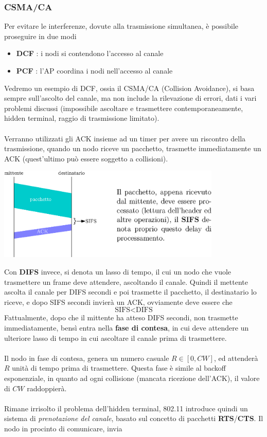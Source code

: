 \documentclass[12pt, letterpaper]{article}
\newcommand{\acc}{\\\hphantom{}\\}
\begin{document}
\subsubsection{CSMA/CA}
Per evitare le interferenze, dovute alla trasmissione simultanea, è possibile proseguire in due modi\begin{itemize}
    \item \textbf{DCF} : i nodi si contendono l'accesso al canale
    \item \textbf{PCF} : l'AP coordina i nodi nell'accesso al canale
\end{itemize} 
Vedremo un esempio di DCF, ossia il CSMA/CA (Collision Avoidance), si basa sempre sull'ascolto del canale, ma non 
include la rilevazione di errori, dati i vari problemi discussi (impossibile ascoltare e trasmettere contemporaneamente, 
hidden terminal, raggio di trasmissione limitato).\acc 
Verranno utilizzati gli ACK insieme ad un timer per avere un riscontro della trasmissione, quando un nodo riceve un 
pacchetto, trasmette immediatamente un ACK (quest'ultimo può essere soggetto a collisioni).\begin{center}
    \includegraphics[width=0.8\textwidth ]{images/CSMA-CA.eps}
\end{center}
Con \textbf{DIFS} invece, si denota un lasso di tempo, il cui un nodo che vuole trasmettere un frame deve 
attendere, ascoltando il canale. Quindi il mettente ascolta il canale per DIFS secondi e poi trasmette il pacchetto, il destinatario lo riceve, 
e dopo SIFS secondi invierà un ACK, ovviamente deve essere che $$\text{SIFS}<\text{DIFS}$$
Fattualmente, dopo che il mittente ha atteso DIFS secondi, non trasmette immediatamente, bensì entra nella 
\textbf{fase di contesa}, in cui deve attendere un ulteriore lasso di tempo in cui ascoltare il canale prima 
di trasmettere. \acc Il nodo in fase di contesa, genera un numero casuale $R\in[0,CW]$, ed attenderà 
$R$ unità di tempo prima di trasmettere. Questa fase è simile al backoff esponenziale, in quanto ad ogni 
collisione (mancata ricezione dell'ACK), il valore di $CW$ raddoppierà.\acc 
Rimane irrisolto il problema dell'hidden terminal, 802.11 introduce quindi un sistema di \textit{prenotazione del 
canale}, basato sul concetto di pacchetti \textbf{RTS}/\textbf{CTS}. Il nodo in procinto di comunicare, invia 
\end{document}
